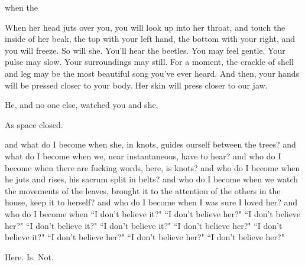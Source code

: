 \documentclass[11pt]{article}
\begin{document}
\begingroup
\begin{center}
when the
\rightskip\leftskip
\end{center}
\endgroup

\vspace*{2\baselineskip}

\begingroup
When her head juts over you, you will look up into her throat, and touch the inside of her beak, the top with your left hand, the bottom with your right, and you will freeze. So will she. You'll hear the beetles. You may feel gentle. Your pulse may slow. Your surroundings may still. For a moment, the crackle of shell and leg may be the most beautiful song you've ever heard. And then, your hands will be pressed closer to your body. Her skin will press closer to our jaw.
\endgroup

\vspace*{2\baselineskip}

\begingroup
\begin{center}
He, and no one else, watched you and she,
\end{center}
\endgroup

\begingroup
\begin{center}
As space closed.
\end{center}
\endgroup

\vspace*{2\baselineskip}

\begingroup
\begin{center}
and what do I become when she, in knots, guides ourself between the trees? and what do I become when we, near instantaneous, have to hear? and who do I become when there are fucking words, here, is knots? and who do I become when he juts and rises, his sacrum split in belts? and who do I become when we watch the movements of the leaves, brought it to the attention of the others in the house, keep it to herself? and who do I become when I was sure I loved her? and who do I become when ``I don't believe it?" ``I don't believe her?" ``I don't believe her?" ``I don't believe it?" ``I don't believe it?" ``I don't believe her?" ``I don't believe it?" ``I don't believe her?" ``I don't believe her?" ``I don't believe her?"
\end{center}
\endgroup

\vspace*{2\baselineskip}

\begingroup
\begin{center}
Here. Is. Not.
\rightskip\leftskip
\end{center}
\endgroup
\end{document}
